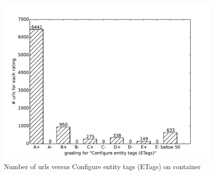 \documentclass[conference]{IEEEtran}
\begin{document}
\begin{figure}[ht]
 \centering
  \includegraphics[scale=0.40]{img/virtual-labs/container/Configure entity tags (ETags).pdf}
\caption{Number of urls versus Configure entity tags (ETags) on container}	
\end{figure}



% 
\end{document}
